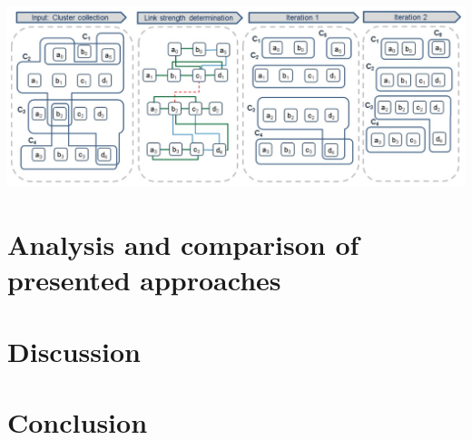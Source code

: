 \documentclass[runningheads]{llncs}
\begin{document}
\begin{center}
\includegraphics[width=1\textwidth]{clip_overlap_resolution.png}
\end{center}




\section{Analysis and comparison of presented approaches}
\section{Discussion}
\section{Conclusion}
\end{document}
